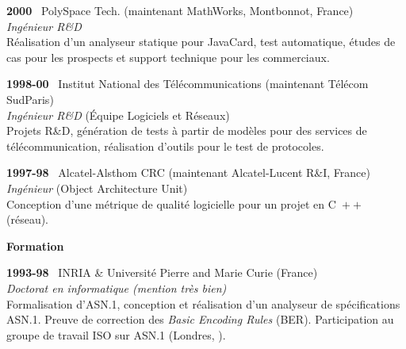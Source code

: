 \documentclass[a4paper,11pt]{article}
\newcommand{\cpp}{\mbox{C \hspace*{-2.5mm} \raise 0.7mm \hbox{${\scriptscriptstyle ++}$}}}
\begin{document}
\bigskip

\noindent\textbf{2000} \ \textsf{PolySpace Tech.\@} (maintenant
MathWorks, Montbonnot, France)\\ \emph{Ingénieur R\&D}\\ Réalisation
d'un analyseur statique pour JavaCard, test automatique, études de cas
pour les prospects et support technique pour les commerciaux.

\bigskip

\noindent\textbf{1998-00} \ \textsf{Institut National des
  Télécommunications} (maintenant Télécom
SudParis)\\ \emph{Ingénieur R\&D} (Équipe Logiciels et
Réseaux)\\ Projets R\&D, génération de tests à partir de modèles pour
des services de télécommunication, réalisation d'outils pour le test
de protocoles.

\bigskip

\noindent\textbf{1997-98} \ \textsf{Alcatel-Alsthom CRC} (maintenant
Alcatel-Lucent R\&I, France)\\ \emph{Ingénieur} (Object
Architecture Unit)\\ Conception d'une métrique de qualité logicielle
pour un projet en \cpp{} (réseau).

\bigskip
\noindent\textbf{\large Formation}
\bigskip

\noindent\textbf{1993-98} \ \textsf{INRIA \& Université Pierre and
  Marie Curie} (France)\\ \emph{Doctorat en informatique (mention très
bien)}\\ Formalisation d'ASN.1, conception et réalisation d'un
analyseur de spécifications ASN.1. Preuve de correction des
\emph{Basic Encoding Rules} (BER). Participation au groupe de travail
ISO sur ASN.1 (Londres, ).


\newpage
\end{document}

